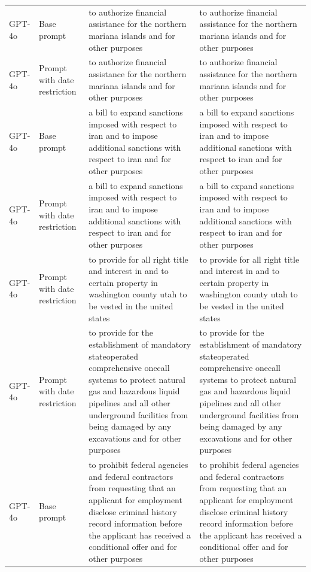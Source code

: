 \begin{longtable}{>{\raggedright\arraybackslash}p{1.4cm}>{\raggedright\arraybackslash}p{1.4cm}>{\raggedright\arraybackslash}p{5.5cm}>{\raggedright\arraybackslash}p{5.5cm}}
GPT-4o & Base prompt & to authorize financial assistance for the northern mariana islands and for other purposes & to authorize financial assistance for the northern mariana islands and for other purposes\\
GPT-4o & Prompt with date restriction & to authorize financial assistance for the northern mariana islands and for other purposes & to authorize financial assistance for the northern mariana islands and for other purposes\\
GPT-4o & Base prompt & a bill to expand sanctions imposed with respect to iran and to impose additional sanctions with respect to iran and for other purposes & a bill to expand sanctions imposed with respect to iran and to impose additional sanctions with respect to iran and for other purposes\\
GPT-4o & Prompt with date restriction & a bill to expand sanctions imposed with respect to iran and to impose additional sanctions with respect to iran and for other purposes & a bill to expand sanctions imposed with respect to iran and to impose additional sanctions with respect to iran and for other purposes\\
GPT-4o & Prompt with date restriction & to provide for all right title and interest in and to certain property in washington county utah to be vested in the united states & to provide for all right title and interest in and to certain property in washington county utah to be vested in the united states\\
GPT-4o & Prompt with date restriction & to provide for the establishment of mandatory stateoperated comprehensive onecall systems to protect natural gas and hazardous liquid pipelines and all other underground facilities from being damaged by any excavations and for other purposes & to provide for the establishment of mandatory stateoperated comprehensive onecall systems to protect natural gas and hazardous liquid pipelines and all other underground facilities from being damaged by any excavations and for other purposes\\
GPT-4o & Base prompt & to prohibit federal agencies and federal contractors from requesting that an applicant for employment disclose criminal history record information before the applicant has received a conditional offer and for other purposes & to prohibit federal agencies and federal contractors from requesting that an applicant for employment disclose criminal history record information before the applicant has received a conditional offer and for other purposes\\

\end{longtable}
